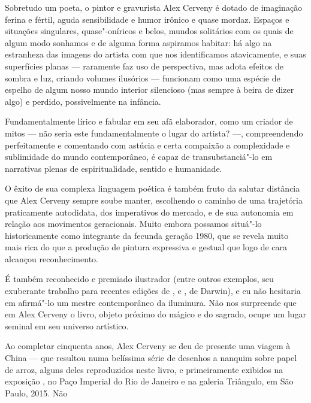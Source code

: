 \begin{multicols}{2}
\noindent{}Sobretudo um poeta, o pintor e gravurista Alex Cerveny é dotado de imaginação ferina e fértil, aguda sensibilidade e humor irônico e quase mordaz. Espaços e situações singulares, quase"-oníricos e belos, mundos solitários com os quais de algum modo sonhamos e de alguma forma aspiramos habitar: há algo na estranheza das imagens do artista com que nos identificamos atavicamente, e suas superfícies planas — raramente faz uso de perspectiva, mas adota efeitos de sombra e luz, criando volumes ilusórios — funcionam como uma espécie de espelho de algum nosso mundo interior silencioso (mas sempre à beira de dizer algo) e perdido, possivelmente na infância.

Fundamentalmente lírico e fabular em seu afã elaborador, como um criador de mitos — não seria este fundamentalmente o lugar do artista? —, compreendendo perfeitamente e comentando com astúcia e certa compaixão a complexidade e sublimidade do mundo contemporâneo, é capaz de transubstanciá"-lo em narrativas plenas de espiritualidade, sentido e humanidade.

O êxito de sua complexa linguagem poética é também fruto da salutar distância que Alex Cerveny sempre soube manter, escolhendo o caminho de uma trajetória praticamente autodidata, dos imperativos do mercado, e de sua autonomia em relação aos movimentos geracionais. Muito embora possamos situá"-lo historicamente como integrante da fecunda geração 1980, que se revela muito mais rica do que a produção de pintura expressiva e gestual que logo de cara alcançou reconhecimento. 

É também reconhecido e premiado ilustrador (entre outros exemplos, seu exuberante trabalho para recentes edições de {}, {} e {}, de Darwin), e eu não hesitaria em afirmá"-lo um mestre contemporâneo da iluminura. Não nos surpreende que em Alex Cerveny o livro, objeto próximo do mágico e do sagrado, ocupe um lugar seminal em seu universo artístico.

Ao completar cinquenta anos, Alex Cerveny se deu de presente uma viagem à China — que resultou numa belíssima série de desenhos a nanquim sobre
papel de arroz, alguns deles reproduzidos neste livro, e primeiramente exibidos na exposição {}, no Paço Imperial do Rio de Janeiro e na galeria Triângulo, em São Paulo, 2015. Não \linebreak

\vspace{\baselineskip}


\end{multicols}

